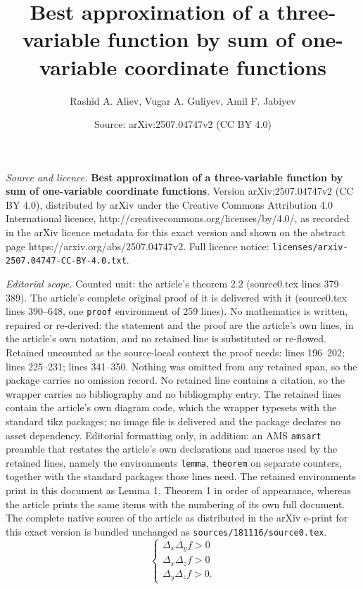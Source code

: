 \documentclass[10pt,a4paper]{amsart}
\title{\textbf{Best approximation of a three-variable function by sum of one-variable coordinate functions}}
\author{Rashid A. Aliev, Vugar A. Guliyev, Amil F. Jabiyev}
\date{Source: arXiv:2507.04747v2 (CC BY 4.0)}
\begin{document}
\maketitle

\noindent\emph{Source and licence.} \textbf{Best approximation of a three-variable function by sum of one-variable coordinate functions}. Version arXiv:2507.04747v2 (CC BY 4.0), distributed by arXiv under the Creative Commons Attribution 4.0 International licence, http://creativecommons.org/licenses/by/4.0/, as recorded in the arXiv licence metadata for this exact version and shown on the abstract page https://arxiv.org/abs/2507.04747v2. Full licence notice: \texttt{licenses/arxiv-2507.04747-CC-BY-4.0.txt}.\par\smallskip

\noindent\textit{Editorial scope.} Counted unit: the article's theorem 2.2 (source0.tex lines 379--389). The article's complete original proof of it is delivered with it (source0.tex lines 390--648, one \texttt{proof} environment of 259 lines). No mathematics is written, repaired or re-derived: the statement and the proof are the article's own lines, in the article's own notation, and no retained line is substituted or re-flowed.  Retained uncounted as the source-local context the proof needs: lines 196--202; lines 225--231; lines 341--350.  Nothing was omitted from any retained span, so the package carries no omission record.  No retained line contains a citation, so the wrapper carries no bibliography and no bibliography entry.  The retained lines contain the article's own diagram code, which the wrapper typesets with the standard tikz packages; no image file is delivered and the package declares no asset dependency.  Editorial formatting only, in addition: an AMS \texttt{amsart} preamble that restates the article's own declarations and macros used by the retained lines, namely the environments \texttt{lemma}, \texttt{theorem} on separate counters, together with the standard packages those lines need.  The retained environments print in this document as Lemma 1, Theorem 1 in order of appearance, whereas the article prints the same items with the numbering of its own full document.  The complete native source of the article as distributed in the arXiv e-print for this exact version is bundled unchanged as \texttt{sources/181116/source0.tex}.
\begin{equation} \label{e:strict-class-definition}
    \begin{cases}
        \Delta_x\Delta_y f> 0\\
        \Delta_x\Delta_z f> 0\\
        \Delta_y\Delta_z f> 0.
    \end{cases}
\end{equation} 
\end{document}
